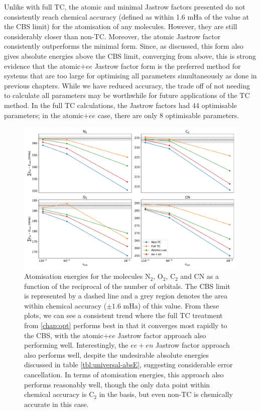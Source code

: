 Unlike with full TC, the atomic and minimal Jastrow factors presented do not consistently reach chemical accuracy (defined as within 1.6 mHa of the value at the CBS limit) for the atomisation of any molecules. However, they are still considerably closer than non-TC. Moreover, the atomic Jastrow factor consistently outperforms the minimal form. Since, as discussed, this form also gives absolute energies above the CBS limit, converging from above, this is strong evidence that the atomic$+ee$ Jastrow factor form is the preferred method for systems that are too large for optimising all parameters simultaneously as done in previous chapters. While we have reduced accuracy, the trade off of not needing to calculate all parameters may be worthwhile for future applications of the TC method. In the full TC calculations, the Jastrow factors had 44 optimisable parameters; in the atomic$+ee$ case, there are only 8 optimisable parameters.



\begin{figure}[htbp]
    \centering
    \includegraphics[width=\textwidth]{figures/universal/atomisation_energies}
    \caption{Atomisation energies for the molecules N$_2$, O$_2$, C$_2$ and CN as a function of the reciprocal of the number of orbitals. The CBS limit is represented by a dashed line and a grey region denotes the area within chemical accuracy ($\pm 1.6$ mHa) of this value. From these plots, we can see a consistent trend where the full TC treatment from \autoref{chap:opt} performs best in that it converges most rapidly to the CBS, with the atomic$+ee$ Jastrow factor approach also performing well. Interestingly, the $ee+en$ Jastrow factor approach also performs well, despite the undesirable absolute energies discussed in table \ref{tbl:universal-absE}, suggesting considerable error cancellation. In terms of atomisation energies, this approach also performs reasonably well, though the only data point within chemical accuracy is C$_2$ in the \vqz basis, but even non-TC is chemically accurate in this case.
    }
    \label{fig:universal-atomisation}
\end{figure}

